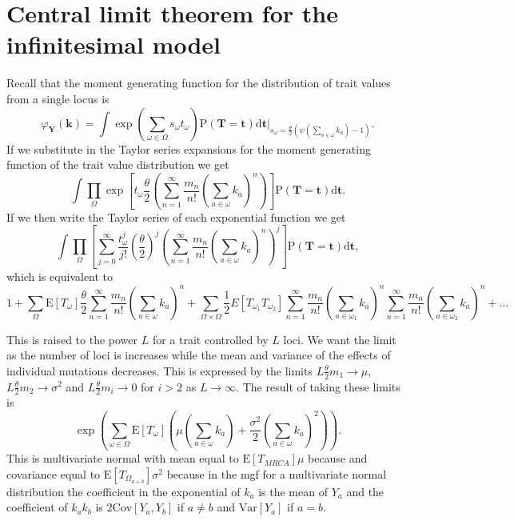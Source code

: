 \documentclass{article}
\newcommand{\T}{\frac{\theta}{2}}
\newcommand{\E}{\mathrm{E}}
\newcommand{\Var}{\mathrm{Var}}
\newcommand{\Cov}{\mathrm{Cov}}
\newcommand{\Pro}{\mathrm{P}}
\begin{document}
\section{Central limit theorem for the infinitesimal model}
\label{clt}
Recall that the moment generating function for the distribution of trait values
from a single locus is
\begin{equation*}
  \varphi_{\mathbf{Y}}(\mathbf{k}) = \int \exp \left( \sum_{\omega \in \Omega} s_{\omega}t_{\omega} \right)
  \Pro(\mathbf{T}=\mathbf{t})\mathrm{d}\mathbf{t}
  \Bigr|_{s_{\omega}=\frac{\theta}{2} \left( \psi\left(\sum_{a \in \omega}k_{a}\right) -1 \right)}.
\end{equation*}
If we substitute in the Taylor series expansions for the moment generating
function of the trait value distribution we get
\begin{equation*}
  \int \prod_{\Omega} \exp\left[ t_{\omega} \T \left( \sum_{n=1}^{\infty} \frac{m_n}{n!}
    \left( \sum_{a \in \omega} k_a \right)^n \right) \right]
  \Pro(\mathbf{T} = \mathbf{t}) \mathrm{d}\mathbf{t}.
\end{equation*}
If we then write the Taylor series of each exponential function we get
\begin{equation*}
  \int \prod_{\Omega} \left[ \sum_{j=0}^\infty \frac{t_{\omega}^j}{j!}
  \left( \T \right)^j \left( \sum_{n=1}^{\infty} \frac{m_n}{n!}
  \left( \sum_{a \in \omega} k_a \right)^n \right)^j \right]
  \Pro(\mathbf{T} = \mathbf{t}) \mathrm{d}\mathbf{t},
\end{equation*}
which is equivalent to
\begin{equation*}
  1 + \sum_{\Omega} \E[T_\omega] \T \sum_{n=1}^{\infty} \frac{m_n}{n!} \left(
  \sum_{a \in \omega} k_a \right)^n +
  \sum_{\Omega \times \Omega} \frac{1}{2} E[T_{\omega_1}T_{\omega_2}]
  \sum_{n=1}^{\infty} \frac{m_n}{n!} \left(\sum_{a \in \omega_1} k_a \right)^n
  \sum_{n=1}^{\infty} \frac{m_n}{n!} \left(\sum_{a \in \omega_2} k_a \right)^n + \ldots
\end{equation*}

This is raised to the power $L$ for a trait controlled by $L$ loci. We want the
limit as the number of loci is increases while the mean and variance of the
effects of individual mutations decreases. This is expressed by the limits
$L \T m_1 \to \mu$, $L \T m_2\to \sigma^2$ and $L \T m_i\to 0$ for $i>2$ as $L \to \infty$.
The result of taking these limits is 
\begin{equation}
  \label{eq:clt}
  \exp \left( \sum_{\omega \in \Omega}\E[T_{\omega}] \left( \mu \left(
  \sum_{a \in \omega} k_a\right) + \frac{\sigma^2}{2}\left( \sum_{a \in \omega}
  k_a\right)^2\right)\right).
\end{equation}
This is multivariate normal with mean equal to $\E[T_{MRCA}]\mu$ because and
covariance equal to $\E[T_{\Omega_{a+b}}]\sigma^2$ because in the mgf for a
multivariate normal distribution the coefficient in the exponential of $k_a$ is
the mean of $Y_a$ and the coefficient of $k_ak_b$ is $2\Cov[Y_a,Y_b]$ if
$a\neq b$ and $\Var[Y_a]$ if $a=b$.
\end{document}

